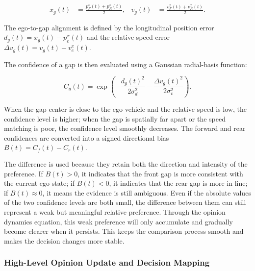 {\small
\begin{equation}
\begin{aligned}
x_g(t)&=\frac{p_F^x(t)+p_R^x(t)}{2},&
v_g(t)&=\frac{v_F^x(t)+v_R^x(t)}{2}.
\end{aligned}
\end{equation}
}







The ego-to-gap alignment is defined by the longitudinal position error \(d_g(t)=x_g(t)-p_e^x(t)\) and the relative speed error \(\Delta v_g(t)=v_g(t)-v_e^x(t)\).







The confidence of a gap is then evaluated using a Gaussian radial-basis function:



{\small
\begin{equation}
C_g(t) =
\exp
\left(
-\frac{d_g(t)^2}{2\sigma_d^2}
-\frac{\Delta v_g(t)^2}{2\sigma_v^2}
\right).
\end{equation}
}





When the gap center is close to the ego vehicle and the relative speed is low, the confidence level is higher; when the gap is spatially far apart or the speed matching is poor, the confidence level smoothly decreases. The forward and rear confidences are converted into a signed directional bias \(B(t)=C_f(t)-C_r(t)\).





The difference is used because they retain both the direction and intensity of the preference. If \(B(t) > 0\), it indicates that the front gap is more consistent with the current ego state; if \(B(t) < 0\), it indicates that the rear gap is more in line; if \(B(t) \approx 0\), it means the evidence is still ambiguous. Even if the absolute values of the two confidence levels are both small, the difference between them can still represent a weak but meaningful relative preference. Through the opinion dynamics equation, this weak preference will only accumulate and gradually become clearer when it persists. This keeps the comparison process smooth and makes the decision changes more stable.



\subsubsection{High-Level Opinion Update and Decision Mapping}






